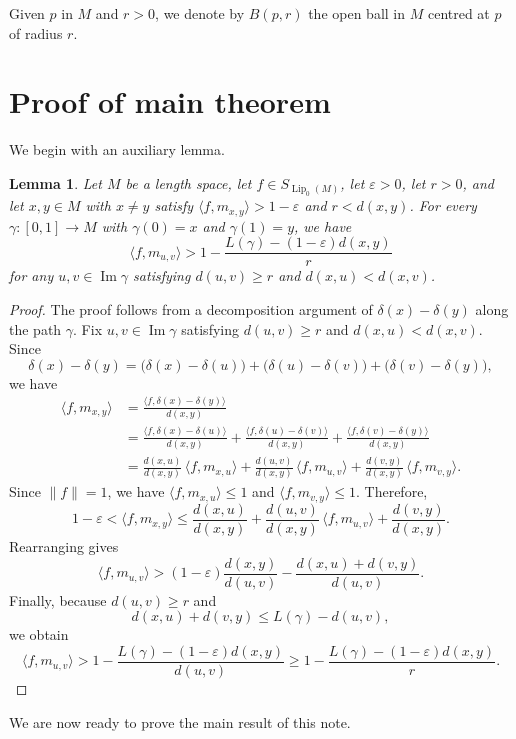 \documentclass[a4paper,12pt]{amsart}
\theoremstyle{plain}
\newtheorem{lem}[thm]{Lemma}
\theoremstyle{definition}
\theoremstyle{remark}
\numberwithin{equation}{section}
\DeclareMathOperator{\Lip}{Lip}
\DeclareMathOperator{\image}{Im}
\begin{document}
Given $p$ in $M$ and $r>0$, we denote by $B(p,r)$ the open ball in $M$ centred at $p$ of radius $r$.

\section{Proof of main theorem}
We begin with an auxiliary lemma.
\begin{lem}\label{lemma:molecule_in_slice}Let $M$ be a length space, let $f\in S_{\Lip_0(M)}$, let $\varepsilon>0$, let $r>0$, and let $x,y\in M$ with $x\neq y$ satisfy $\langle f,m_{x,y}\rangle>1-\varepsilon$ and $r<d(x,y)$. For every $\gamma:[0,1]\rightarrow M$ with $\gamma(0)=x$ and $\gamma(1)=y$, we have 
\[
\langle f,m_{u,v}\rangle
>1-\frac{L(\gamma)-(1-\varepsilon)d(x,y)}{r}
\]
for any $u,v\in \image \gamma$ satisfying $d(u,v)\geq r$ and $d(x,u)<d(x,v)$.
\end{lem}
\begin{proof}
The proof follows from a decomposition argument of 
$\delta(x)-\delta(y)$ along the path $\gamma$. Fix $u,v\in \image \gamma$ satisfying $d(u,v)\geq r$ and $d(x,u)<d(x,v)$.
Since
\[
\delta(x)-\delta(y)
=\big(\delta(x)-\delta(u)\big)+\big(\delta(u)-\delta(v)\big)+\big(\delta(v)-\delta(y)\big),
\]
we have
\begin{align*}
\langle f,m_{x,y}\rangle
&=\frac{\langle f,\delta(x)-\delta(y)\rangle}{d(x,y)}\\
&=\frac{\langle f,\delta(x)-\delta(u)\rangle}{d(x,y)}
 +\frac{\langle f,\delta(u)-\delta(v)\rangle}{d(x,y)}
 +\frac{\langle f,\delta(v)-\delta(y)\rangle}{d(x,y)}\\
&=\frac{d(x,u)}{d(x,y)}\,\langle f,m_{x,u}\rangle
 +\frac{d(u,v)}{d(x,y)}\,\langle f,m_{u,v}\rangle
 +\frac{d(v,y)}{d(x,y)}\,\langle f,m_{v,y}\rangle .
\end{align*}
Since $\|f\|=1$, we have $\langle f,m_{x,u}\rangle\le 1$ and
$\langle f,m_{v,y}\rangle\le 1$. Therefore,
\[
1-\varepsilon
<\langle f,m_{x,y}\rangle
\le
\frac{d(x,u)}{d(x,y)}
+\frac{d(u,v)}{d(x,y)}\,\langle f,m_{u,v}\rangle
+\frac{d(v,y)}{d(x,y)}.
\]
Rearranging gives
\[
\langle f,m_{u,v}\rangle
>
(1-\varepsilon)\frac{d(x,y)}{d(u,v)}
-\frac{d(x,u)+d(v,y)}{d(u,v)}.
\]
Finally, because $d(u,v)\ge r$ and
\[
d(x,u)+d(v,y)
\le L(\gamma)-d(u,v),
\]
we obtain
\[
\langle f,m_{u,v}\rangle
>
1-\frac{L(\gamma)-(1-\varepsilon)d(x,y)}{d(u,v)}
\ge
1-\frac{L(\gamma)-(1-\varepsilon)d(x,y)}{r}.
\]
\end{proof}


We are now ready to prove the main result of this note.
\end{document}
